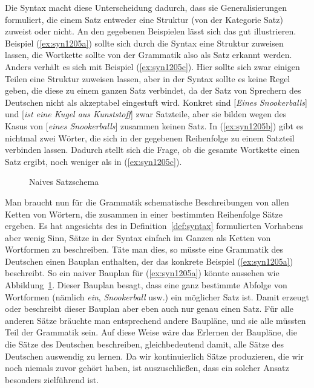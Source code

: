 Die Syntax macht diese Unterscheidung dadurch, dass sie Generalisierungen formuliert, die einem Satz entweder eine Struktur (von der Kategorie Satz) zuweist oder nicht.
An den gegebenen Beispielen lässt sich das gut illustrieren.
Beispiel (\ref{ex:syn1205a}) sollte sich durch die Syntax eine Struktur zuweisen lassen, die Wortkette sollte von der Grammatik also als Satz erkannt werden.
Anders verhält es sich mit Beispiel (\ref{ex:syn1205c}).
Hier sollte sich zwar einigen Teilen eine Struktur zuweisen lassen, aber in der Syntax sollte es keine Regel geben, die diese zu einem ganzen Satz verbindet, da der Satz von Sprechern des Deutschen \idR nicht als akzeptabel eingestuft wird.
Konkret sind [\textit{Eines Snookerballs}] und [\textit{ist eine Kugel aus Kunststoff}] zwar Satzteile, aber sie bilden wegen des Kasus von [\textit{eines Snookerballs}] zusammen keinen Satz.
In (\ref{ex:syn1205b}) gibt es nichtmal zwei Wörter, die sich in der gegebenen Reihenfolge zu einem Satzteil verbinden lassen.
Dadurch stellt sich die Frage, ob die gesamte Wortkette einen Satz ergibt, noch weniger als in (\ref{ex:syn1205c}).

\begin{figure}[!htbp]
  \centering
  \caption{Naives Satzschema}
  \label{fig:satzschema1}
\end{figure}

Man braucht nun für die Grammatik schematische Beschreibungen von allen Ketten von Wörtern, die zusammen in einer bestimmten Reihenfolge Sätze ergeben.
Es hat angesichts des in Definition~\ref{def:syntax} formulierten Vorhabens aber wenig Sinn, Sätze in der Syntax einfach im Ganzen als Ketten von Wortformen zu beschreiben.
Täte man dies, so müsste eine Grammatik des Deutschen einen Bauplan enthalten, der das konkrete Beispiel (\ref{ex:syn1205a}) beschreibt.
So ein naiver Bauplan für (\ref{ex:syn1205a}) könnte aussehen wie Abbildung~\ref{fig:satzschema1}.
Dieser Bauplan besagt, dass eine ganz bestimmte Abfolge von Wortformen (nämlich \textit{ein}, \textit{Snookerball} usw.) ein möglicher Satz ist.
Damit erzeugt oder beschreibt dieser Bauplan aber eben auch nur genau einen Satz.
Für alle anderen Sätze bräuchte man entsprechend andere Baupläne, und sie alle müssten Teil der Grammatik sein.
Auf diese Weise wäre das Erlernen der Baupläne, die die Sätze des Deutschen beschreiben, gleichbedeutend damit, alle Sätze des Deutschen auswendig zu lernen.
Da wir kontinuierlich Sätze produzieren, die wir noch niemals zuvor gehört haben, ist auszuschließen, dass ein solcher Ansatz besonders zielführend ist.

